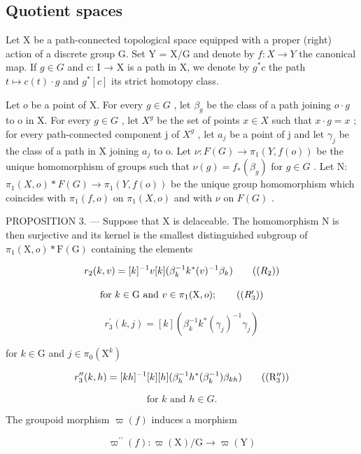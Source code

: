 \subsection{Quotient spaces}

Let X be a path-connected topological space equipped with a proper (right) action of a discrete group G. Set Y = X/G and denote by \(f: X \to Y\) the canonical map. If \(g \in G\) and c: I → X is a path in X, we denote by \(g^{*}c\) the path \(t \mapsto c(t) \cdot g\) and \(g^{*}[c]\) its strict homotopy class.

Let \(o\) be a point of X. For every \(g \in G\) , let \(\beta_{g}\) be the class of a path joining \(o \cdot g\) to o in X. For every \(g \in G\) , let \(X^{g}\) be the set of points \(x \in X\) such that \(x \cdot g = x\) ; for every path-connected component j of \(X^{g}\) , let \(a_{j}\) be a point of j and let \(\gamma_{j}\) be the class of a path in X joining \(a_{j}\) to o. Let \(\nu: F(G) \to \pi_{1}(Y, f(o))\) be the unique homomorphism of groups such that \(\nu(g) = f_{*}(\beta_{g})\) for \(g \in G\) . Let N: \(\pi_{1}(X, o) * F(G) \to \pi_{1}(Y, f(o))\) be the unique group homomorphism which coincides with \(\pi_{1}(f, o)\) on \(\pi_{1}(X, o)\) and with \(\nu\) on \(F(G)\) .

PROPOSITION 3. --- Suppose that X is delaceable. The homomorphism N is then surjective and its kernel is the smallest distinguished subgroup of \(\pi_{1}(\mathrm{X},o)*\mathrm{F}(\mathrm{G})\) containing the elements

\[
r _ {2} (k, v) = [ k ] ^ {- 1} v [ k ] (\beta_ {k} ^ {- 1} k ^ {*} (v) ^ {- 1} \beta_ {k})\tag{\((R_{2})\)}
\]

\[
\text {for } k \in \mathrm{G} \text { and } v \in \pi_ {1} (\mathrm{X}, o);\tag{\((R_{3}^{\prime})\)}
\]

\[
r _ {3} ^ {\prime} (k, j) = [ k ] (\beta_ {k} ^ {- 1} k ^ {*} (\gamma_ {j}) ^ {- 1} \gamma_ {j})
\]

for \(k\in \mathrm{G}\) and \(j\in \pi_0(\mathrm{X}^k)\)

\[
r _ {3} ^ {\prime \prime} (k, h) = [ k h ] ^ {- 1} [ k ] [ h ] (\beta_ {h} ^ {- 1} h ^ {*} (\beta_ {k} ^ {- 1}) \beta_ {k h})\tag{\((\mathrm{R}_{3}^{\prime \prime})\)}
\]

\[
\text {for } k \text { and } h \in G.
\]

The groupoid morphism \(\varpi(f)\) induces a morphism

\[
\varpi^ {\prime \prime} (f) \colon \varpi (\mathrm{X}) / \mathrm{G} \to \varpi (\mathrm{Y})
\]

